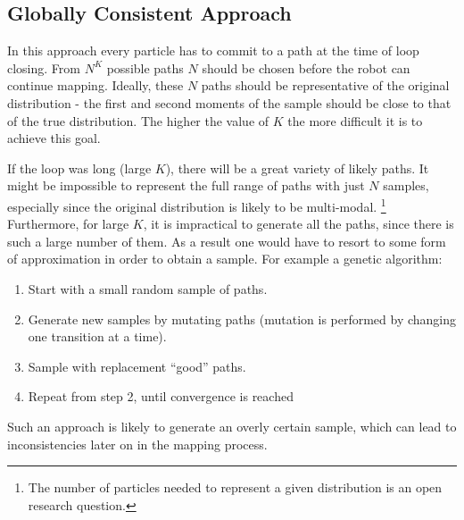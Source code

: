 \subsection{Globally Consistent Approach}

In this approach every particle has to commit to a path at the time of
loop closing. From $N^K$ possible paths $N$ should be chosen before
the robot can continue mapping. Ideally, these $N$ paths should be
representative of the original distribution - the first
and second moments of the sample should be close to that of the true
distribution. The higher the value of $K$ the more difficult it is
to achieve this goal. 

If the loop was long (large $K$), there will be a great variety of
likely paths. It might be impossible to represent the full range of
paths with just $N$ samples, especially since the original distribution
is likely to be multi-modal.
\footnote{The number of particles needed to represent a given
distribution is an open research question.} Furthermore, for large
$K$, it is impractical to generate all the paths, since there is such
a large number of them. As a result one would have to resort to some
form of approximation in order to obtain a sample. For example a
genetic algorithm: 
\begin{enumerate}
\item Start with a small random sample of paths. 
\item Generate new samples by mutating paths (mutation is performed by
  changing one transition at a time).
\item Sample with replacement ``good'' paths.
\item Repeat from step 2, until convergence is reached
\end{enumerate}

Such an approach is likely to generate an overly certain sample, which
can lead to inconsistencies later on in the mapping process.



%



